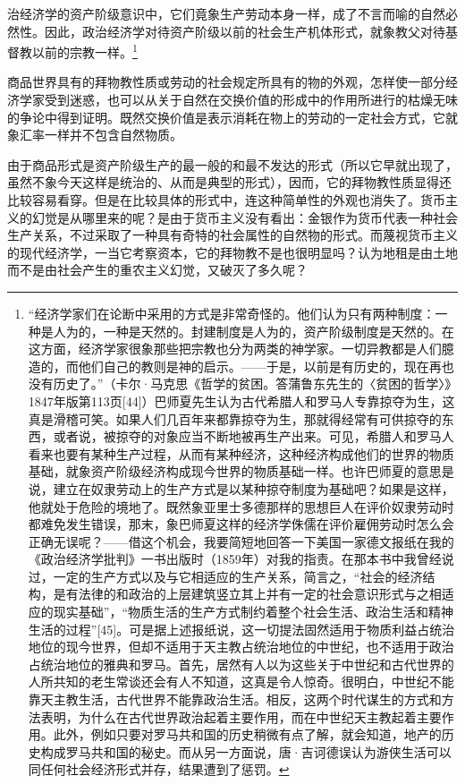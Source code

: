 \documentclass{ctexbook}
\begin{document}
治经济学的资产阶级意识中，它们竟象生产劳动本身一样，成了不言而喻的自然必然性。因此，政治经济学对待资产阶级以前的社会生产机体形式，就象教父对待基督教以前的宗教一样。\footnote{“经济学家们在论断中采用的方式是非常奇怪的。他们认为只有两种制度：一种是人为的，一种是天然的。封建制度是人为的，资产阶级制度是天然的。在这方面，经济学家很象那些把宗教也分为两类的神学家。一切异教都是人们臆造的，而他们自己的教则是神的启示。——于是，以前是有历史的，现在再也没有历史了。”（卡尔·马克思《哲学的贫困。答蒲鲁东先生的〈贫困的哲学〉》1847年版第113页[44]）巴师夏先生认为古代希腊人和罗马人专靠掠夺为生，这真是滑稽可笑。如果人们几百年来都靠掠夺为生，那就得经常有可供掠夺的东西，或者说，被掠夺的对象应当不断地被再生产出来。可见，希腊人和罗马人看来也要有某种生产过程，从而有某种经济，这种经济构成他们的世界的物质基础，就象资产阶级经济构成现今世界的物质基础一样。也许巴师夏的意思是说，建立在奴隶劳动上的生产方式是以某种掠夺制度为基础吧？如果是这样，他就处于危险的境地了。既然象亚里士多德那样的思想巨人在评价奴隶劳动时都难免发生错误，那末，象巴师夏这样的经济学侏儒在评价雇佣劳动时怎么会正确无误呢？——借这个机会，我要简短地回答一下美国一家德文报纸在我的《政治经济学批判》一书出版时（1859年）对我的指责。在那本书中我曾经说过，一定的生产方式以及与它相适应的生产关系，简言之，“社会的经济结构，是有法律的和政治的上层建筑竖立其上并有一定的社会意识形式与之相适应的现实基础”，“物质生活的生产方式制约着整个社会生活、政治生活和精神生活的过程”[45]。可是据上述报纸说，这一切提法固然适用于物质利益占统治地位的现今世界，但却不适用于天主教占统治地位的中世纪，也不适用于政治占统治地位的雅典和罗马。首先，居然有人以为这些关于中世纪和古代世界的人所共知的老生常谈还会有人不知道，这真是令人惊奇。很明白，中世纪不能靠天主教生活，古代世界不能靠政治生活。相反，这两个时代谋生的方式和方法表明，为什么在古代世界政治起着主要作用，而在中世纪天主教起着主要作用。此外，例如只要对罗马共和国的历史稍微有点了解，就会知道，地产的历史构成罗马共和国的秘史。而从另一方面说，唐·吉诃德误认为游侠生活可以同任何社会经济形式并存，结果遭到了惩罚。}
    
    商品世界具有的拜物教性质或劳动的社会规定所具有的物的外观，怎样使一部分经济学家受到迷惑，也可以从关于自然在交换价值的形成中的作用所进行的枯燥无味的争论中得到证明。既然交换价值是表示消耗在物上的劳动的一定社会方式，它就象汇率一样并不包含自然物质。
    
    由于商品形式是资产阶级生产的最一般的和最不发达的形式（所以它早就出现了，虽然不象今天这样是统治的、从而是典型的形式），因而，它的拜物教性质显得还比较容易看穿。但是在比较具体的形式中，连这种简单性的外观也消失了。货币主义的幻觉是从哪里来的呢？是由于货币主义没有看出：金银作为货币代表一种社会生产关系，不过采取了一种具有奇特的社会属性的自然物的形式。而蔑视货币主义的现代经济学，一当它考察资本，它的拜物教不是也很明显吗？认为地租是由土地而不是由社会产生的重农主义幻觉，又破灭了多久呢？
    
\end{document}
